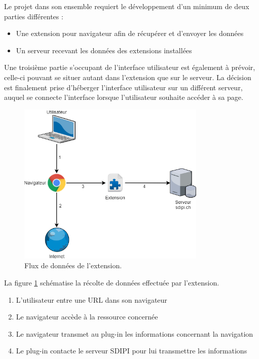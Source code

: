 		Le projet dans son ensemble requiert le développement d'un minimum de deux parties différentes :

		\begin{itemize}
			\item Une extension pour navigateur afin de récupérer et d'envoyer les données
			\item Un serveur recevant les données des extensions installées
		\end{itemize}

		Une troisième partie s'occupant de l'interface utilisateur est également à prévoir, celle-ci pouvant se situer autant dans l'extension que sur le serveur. La décision est finalement prise d'héberger l'interface utilisateur sur un différent serveur, auquel se connecte l'interface lorsque l'utilisateur souhaite accéder à sa page.

		\begin{figure}[h]
			\centering
			\includegraphics[width=0.8\textwidth]{images/design/intro/architecture}
			\caption{Flux de données de l'extension.}
			\label{d-architecture}
		\end{figure}

		La figure \ref{d-architecture} schématise la récolte de données effectuée par l’extension.
		\begin{enumerate}
			\item L'utilisateur entre une URL dans son navigateur
			\item Le navigateur accède à la ressource concernée
			\item Le navigateur transmet au plug-in les informations concernant la navigation
			\item Le plug-in contacte le serveur SDIPI pour lui transmettre les informations
		\end{enumerate}

